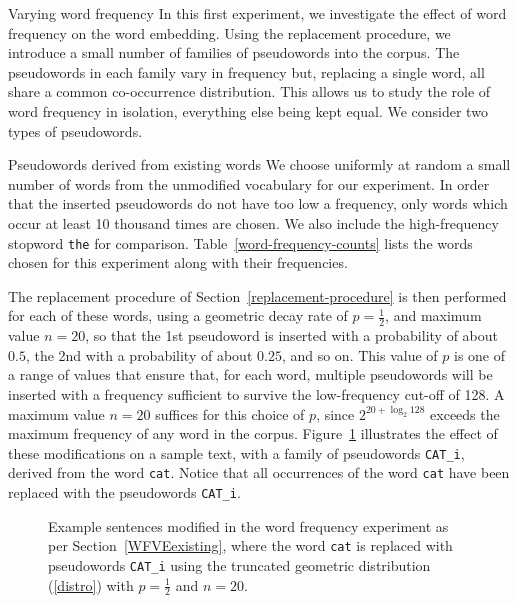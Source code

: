 \documentclass{article} %
\newcommand{\word}[1]{\texttt{#1}}
\begin{document}
\begin{section}{Varying word frequency}\label{WFVE}
In this first experiment, we investigate the effect of word frequency on
the word embedding.  Using the replacement procedure, we introduce a
small number of families of pseudowords into the corpus.  The pseudowords in each
family vary in frequency but, replacing a single word, all share a
common co-occurrence distribution.  This allows us to study the role of
word frequency in isolation, everything else being kept equal.  We
consider two types of pseudowords.

\begin{subsection}{Pseudowords derived from existing words}\label{WFVEexisting}
We choose uniformly at random a small number of words from the
unmodified vocabulary for our experiment.  In order that the inserted
pseudowords do not have too low a frequency, only words which occur at least
10 thousand times are chosen.  We also include the high-frequency
stopword \word{the} for comparison.  Table~\ref{word-frequency-counts}
lists the words chosen for this experiment along with their frequencies.

The replacement procedure of Section~\ref{replacement-procedure} is then
performed for each of these words, using a geometric decay rate of $p =
\tfrac{1}{2}$, and maximum value $n=20$, so that the 1st pseudoword is
inserted with a probability of about $0.5$, the 2nd with a probability of
about $0.25$, and so on.  This value of $p$ is one of a range of values
that ensure that, for each word, multiple pseudowords will be inserted with a
frequency sufficient to survive the low-frequency cut-off of
128.  A maximum value $n=20$ suffices for this choice of $p$, since
$2^{20 + \log_2{128}}$ exceeds the maximum frequency of any word in
the corpus.  Figure~\ref{fig:word-frequency-experiment-text-cat}
illustrates the effect of these modifications on a sample text, with a
family of pseudowords \word{CAT\_i}, derived from the word \word{cat}.
Notice that all occurrences of the word \word{cat} have been replaced
with the pseudowords \word{CAT\_i}.

\begin{table}
	
	\caption{Words chosen for the word frequency experiment, along with their frequency in the unmodified corpus. }
	\label{word-frequency-counts}
\end{table}

\begin{figure}
	\begin{mdframed}
	
	\end{mdframed}
	\caption{Example sentences modified in the word frequency
          experiment as per Section~\ref{WFVEexisting}, where the word
          \word{cat} is replaced with pseudowords \word{CAT\_i} using the
          truncated geometric distribution (\ref{distro}) with
          $p=\tfrac{1}{2}$ and $n=20$.}
	\label{fig:word-frequency-experiment-text-cat}
\end{figure}


\end{subsection}
\end{section}
\end{document}
